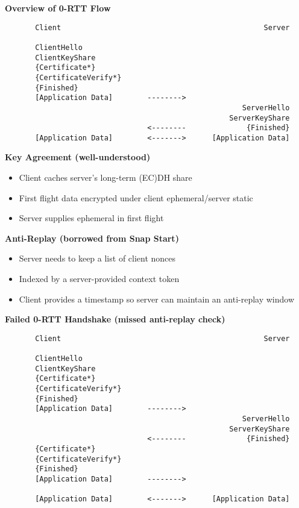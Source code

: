 \documentclass[helvetica]{seminar}
\newcommand{\heading}[1]{%
  \begin{center} 
    \large\bf 
    #1 
  \end{center} 
  \vspace{.4 in}}
\begin{document}
\centerslidesfalse 

\begin{slide}
\heading{Overview of 0-RTT Flow}

{\scriptsize
\begin{verbatim}
       Client                                               Server

       ClientHello
       ClientKeyShare
       {Certificate*}
       {CertificateVerify*}
       {Finished}              
       [Application Data]        -------->
                                                       ServerHello
                                                    ServerKeyShare
                                 <--------              {Finished}
       [Application Data]        <------->      [Application Data]
\end{verbatim}
}
\end{slide}


\begin{slide}
\heading{Key Agreement (well-understood)}

\begin{itemize}
\item Client caches server's long-term (EC)DH share
\item First flight data encrypted under client ephemeral/server static
\item Server supplies ephemeral in first flight
\end{itemize}
\end{slide}


\begin{slide}
\heading{Anti-Replay (borrowed from Snap Start)}

\begin{itemize}
\item Server needs to keep a list of client nonces
\item Indexed by a server-provided context token
\item Client provides a timestamp so server can maintain an anti-replay window
\end{itemize}
\end{slide}

\begin{slide}
\heading{Failed 0-RTT Handshake (missed anti-replay check)}

{\scriptsize
\begin{verbatim}
       Client                                               Server

       ClientHello
       ClientKeyShare
       {Certificate*}
       {CertificateVerify*}
       {Finished}              
       [Application Data]        -------->
                                                       ServerHello
                                                    ServerKeyShare
                                 <--------              {Finished}
       {Certificate*}
       {CertificateVerify*}
       {Finished}              
       [Application Data]        -------->

       [Application Data]        <------->      [Application Data]
\end{verbatim}
}
\end{slide}
\end{document}
